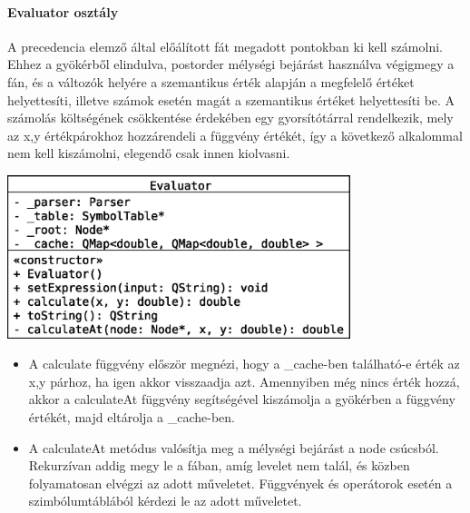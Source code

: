 \documentclass[12pt]{report}
\begin{document}
\paragraph{Evaluator osztály}
A precedencia elemző által előálított fát megadott pontokban ki kell számolni. Ehhez a gyökérből elindulva, postorder mélységi bejárást használva végigmegy a fán, és a változók helyére a szemantikus érték alapján a megfelelő értéket helyettesíti, illetve számok esetén magát a szemantikus értéket helyettesíti be. A számolás költségének csökkentése érdekében egy gyorsítótárral rendelkezik, mely az x,y értékpárokhoz hozzárendeli a függvény értékét, így a következő alkalommal nem kell kiszámolni, elegendő csak innen kiolvasni.
\begin{center}
\includegraphics[width=10cm]{pics/uml/Evaluator}
\end{center}
\begin{itemize}
\item A calculate függvény először megnézi, hogy a \_cache-ben található-e érték az x,y párhoz, ha igen akkor visszaadja azt. Amennyiben még nincs érték hozzá, akkor a calculateAt függvény segítségével kiszámolja a gyökérben a függvény értékét, majd eltárolja a \_cache-ben.
\item A calculateAt metódus valósítja meg a mélységi bejárást a node csúcsból. Rekurzívan addig megy le a fában, amíg levelet nem talál, és közben folyamatosan elvégzi az adott műveletet. Függvények és operátorok esetén a szimbólumtáblából kérdezi le az adott műveletet.
\end{itemize}
\end{document}

